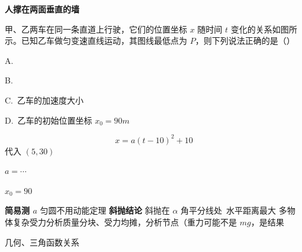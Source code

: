 \textbf{人撑在两面垂直的墙}
\begin{problem}
甲、乙两车在同一条直道上行驶，它们的位置坐标 $x$ 随时间 $t$ 变化的关系如图所示。已知乙车做匀变速直线运动，其图线最低点为 $P$，则下列说法正确的是（\quad）
\par A.\ 
\par B.\ 
\par C.\ 乙车的加速度大小
\par D.\ 乙车的初始位置坐标 $x_0=90\unit{m}$
\begin{solution}
\[ x=a(t-10)^2+10 \]
代入 $(5,30)$\par
$a=\cdots$\par
$x_0=90$
\end{solution}
\end{problem}
\textbf{简易测 $a$}
匀圆不用动能定理
\textbf{斜抛结论}
斜抛在 $\alpha$ 角平分线处\ 水平距离最大
多物体复杂受力分析\quad 质量分块、受力均摊，分析节点（重力可能不是 $mg$，是结果 %
\par 几何、三角函数关系 %
